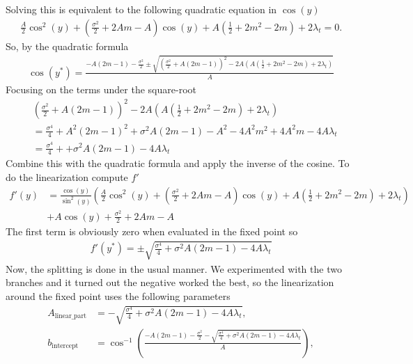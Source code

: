 Solving this is equivalent to the following quadratic equation in $\cos(y)$
\begin{align}
    \frac{A}{2}\cos^2(y) + \left(\frac{\sigma^2}{2} + 2 Am - A\right)\cos(y)
    + A \left(\frac{1}{2} + 2m^2 - 2m\right) + 2\lambda_t = 0.
\end{align}
So, by the quadratic formula
\begin{align}
    \cos(y^*) = \frac{-A\left(2m - 1\right) - \frac{\sigma^2}{2}\pm\sqrt{\left(\frac{\sigma^2}{2}+A\left(2m - 1\right)\right)^2 - 2A\left(A \left(\frac{1}{2} + 2m^2 - 2m\right) + 2\lambda_t\right)}}{A}\nonumber
\end{align}
Focusing on the terms under the square-root
\begin{align*}
    &\left(\frac{\sigma^2}{2}+A\left(2m - 1\right)\right)^2 - 2A\left(A \left(\frac{1}{2} + 2m^2 - 2m\right) + 2\lambda_t\right) \\
    &= \frac{\sigma^4}{4} + A^2\left(2m - 1\right)^2 + \sigma^2A\left(2m - 1\right)- A^2- 4A^2m^2 + 4A^2m-4A\lambda_t\\
    &= \frac{\sigma^4}{4} + +\sigma^2A\left(2m - 1\right) - 4A\lambda_t
\end{align*}
Combine this with the quadratic formula and apply the inverse of the cosine. To do the linearization compute $f'$
\begin{align}
    f'(y) &= \frac{\cos(y)}{\sin^2(y)}\left(\frac{A}{2}\cos^2(y) + \left(\frac{\sigma^2}{2} + 2 Am - A\right)\cos(y)
    + A \left(\frac{1}{2} + 2m^2 - 2m\right) + 2\lambda_t\right) \nonumber\\
    &+ A\cos(y) + \frac{\sigma^2}{2} + 2Am - A
\end{align}
The first term is obviously zero when evaluated in the fixed point so
\begin{align}
    f'(y^*) = \pm \sqrt{\frac{\sigma^4}{4} + \sigma^2A\left(2m - 1\right) - 4A\lambda_t}
\end{align}
Now, the splitting is done in the usual manner. We experimented with the two branches and it turned out the negative worked the best, so the linearization around the fixed point uses the following parameters 
\begin{align}
    A_{\mathrm{linear\_part}} &= -\sqrt{\frac{\sigma^4}{4} + \sigma^2A\left(2m - 1\right) - 4A\lambda_t},\\
    b_{\mathrm{intercept}} &= \cos^{-1}\left(\frac{-A\left(2m - 1\right) - \frac{\sigma^2}{2} - \sqrt{\frac{\sigma^4}{4} + \sigma^2A\left(2m - 1\right) - 4A\lambda_t}}{A}\right),
\end{align}
